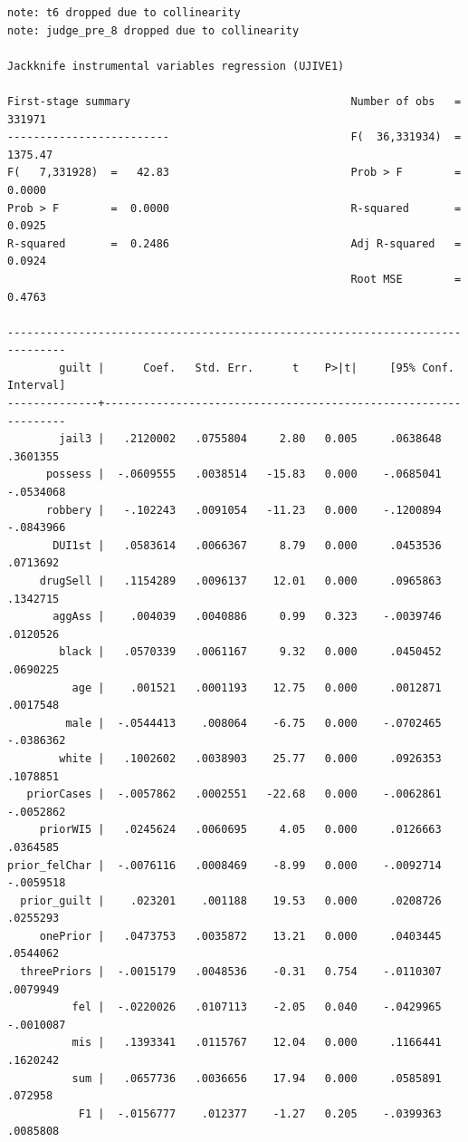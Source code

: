 \documentclass[
]{book}
\begin{document}
\begin{verbatim}
note: t6 dropped due to collinearity
note: judge_pre_8 dropped due to collinearity

Jackknife instrumental variables regression (UJIVE1)

First-stage summary                                  Number of obs   =  331971
-------------------------                            F(  36,331934)  = 1375.47
F(   7,331928)  =   42.83                            Prob > F        =  0.0000
Prob > F        =  0.0000                            R-squared       =  0.0925
R-squared       =  0.2486                            Adj R-squared   =  0.0924
                                                     Root MSE        =  0.4763

-------------------------------------------------------------------------------
        guilt |      Coef.   Std. Err.      t    P>|t|     [95% Conf. Interval]
--------------+----------------------------------------------------------------
        jail3 |   .2120002   .0755804     2.80   0.005     .0638648    .3601355
      possess |  -.0609555   .0038514   -15.83   0.000    -.0685041   -.0534068
      robbery |   -.102243   .0091054   -11.23   0.000    -.1200894   -.0843966
       DUI1st |   .0583614   .0066367     8.79   0.000     .0453536    .0713692
     drugSell |   .1154289   .0096137    12.01   0.000     .0965863    .1342715
       aggAss |    .004039   .0040886     0.99   0.323    -.0039746    .0120526
        black |   .0570339   .0061167     9.32   0.000     .0450452    .0690225
          age |    .001521   .0001193    12.75   0.000     .0012871    .0017548
         male |  -.0544413    .008064    -6.75   0.000    -.0702465   -.0386362
        white |   .1002602   .0038903    25.77   0.000     .0926353    .1078851
   priorCases |  -.0057862   .0002551   -22.68   0.000    -.0062861   -.0052862
     priorWI5 |   .0245624   .0060695     4.05   0.000     .0126663    .0364585
prior_felChar |  -.0076116   .0008469    -8.99   0.000    -.0092714   -.0059518
  prior_guilt |    .023201    .001188    19.53   0.000     .0208726    .0255293
     onePrior |   .0473753   .0035872    13.21   0.000     .0403445    .0544062
  threePriors |  -.0015179   .0048536    -0.31   0.754    -.0110307    .0079949
          fel |  -.0220026   .0107113    -2.05   0.040    -.0429965   -.0010087
          mis |   .1393341   .0115767    12.04   0.000     .1166441    .1620242
          sum |   .0657736   .0036656    17.94   0.000     .0585891     .072958
           F1 |  -.0156777    .012377    -1.27   0.205    -.0399363    .0085808

\end{verbatim}
\end{document}
